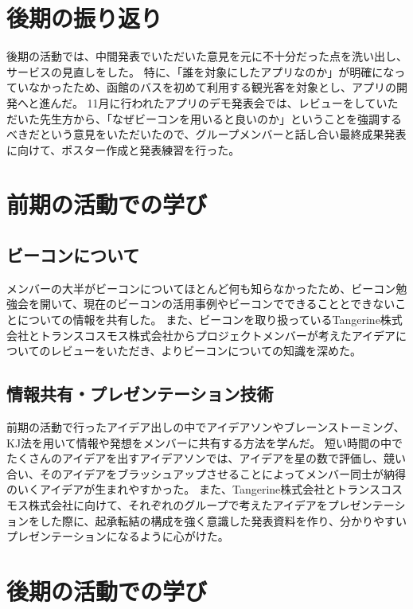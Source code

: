 \documentclass[openany,11pt,papersize]{jsbook}
\begin{document}

\section{後期の振り返り}
後期の活動では、中間発表でいただいた意見を元に不十分だった点を洗い出し、サービスの見直しをした。
特に、「誰を対象にしたアプリなのか」が明確になっていなかったため、函館のバスを初めて利用する観光客を対象とし、アプリの開発へと進んだ。
11月に行われたアプリのデモ発表会では、レビューをしていただいた先生方から、「なぜビーコンを用いると良いのか」ということを強調するべきだという意見をいただいたので、グループメンバーと話し合い最終成果発表に向けて、ポスター作成と発表練習を行った。


\section{前期の活動での学び}
\subsection{ビーコンについて}
メンバーの大半がビーコンについてほとんど何も知らなかったため、ビーコン勉強会を開いて、現在のビーコンの活用事例やビーコンでできることとできないことについての情報を共有した。
また、ビーコンを取り扱っているTangerine株式会社とトランスコスモス株式会社からプロジェクトメンバーが考えたアイデアについてのレビューをいただき、よりビーコンについての知識を深めた。


\subsection{情報共有・プレゼンテーション技術}
前期の活動で行ったアイデア出しの中でアイデアソンやブレーンストーミング、KJ法を用いて情報や発想をメンバーに共有する方法を学んだ。
短い時間の中でたくさんのアイデアを出すアイデアソンでは、アイデアを星の数で評価し、競い合い、そのアイデアをブラッシュアップさせることによってメンバー同士が納得のいくアイデアが生まれやすかった。
また、Tangerine株式会社とトランスコスモス株式会社に向けて、それぞれのグループで考えたアイデアをプレゼンテーションをした際に、起承転結の構成を強く意識した発表資料を作り、分かりやすいプレゼンテーションになるように心がけた。


\section{後期の活動での学び}
\end{document}
